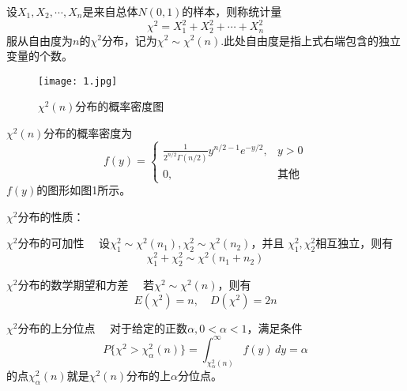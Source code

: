\begin{definition}[$\chi^2$分布]
    设$X_1,X_2,\cdots,X_n$是来自总体$N(0,1)$的样本，则称统计量
    $$\chi^2=X_1^2+X_2^2+\cdots+X_n^2$$
    服从自由度为$n$的{\heiti $\chi^2$分布}，记为$\chi^2\sim \chi^2(n)$.此处自由度是指上式右端包含的独立变量的个数。
    \begin{figure}[H]
        \centering
        \texttt{[image: 1.jpg]}
        \caption{$\chi^2(n)$分布的概率密度图}
    \end{figure} 
    $\chi^2(n)$分布的概率密度为
    $$f(y)=\left\{\begin{array}{ll}
        \frac{1}{2^{n/2}\Gamma (n/2)}y^{n/2-1}e^{-y/2},& y>0\\
        0,&\mbox{其他}
    \end{array}\right.$$
    $f(y)$的图形如图1所示。

\end{definition}

\begin{theorem}
    $\chi^2$分布的性质：

    {\heiti $\chi^2$分布的可加性}$\quad$ 设$\chi^2_1\sim \chi^2(n_1),\chi^2_2\sim \chi^2(n_2)$，并且
    $\chi^2_1,\chi^2_2$相互独立，则有
    $$\chi^2_1+\chi^2_2\sim \chi^2(n_1+n_2)$$

    {\heiti $\chi^2$分布的数学期望和方差}$\quad$ 若$\chi^2\sim \chi^2(n)$，则有
    $$E(\chi^2)=n,\quad D(\chi^2)=2n$$
    
    {\heiti $\chi^2$分布的上分位点}$\quad$ 对于给定的正数$\alpha,0<\alpha<1$，满足条件
    $$P\{\chi^2>\chi_\alpha^2(n)\}=\int_{\chi_\alpha^2(n)}^\infty f(y)\,dy=\alpha$$
    的点$\chi_\alpha^2(n)$就是$\chi^2(n)$分布的上$\alpha$分位点。

\end{theorem}